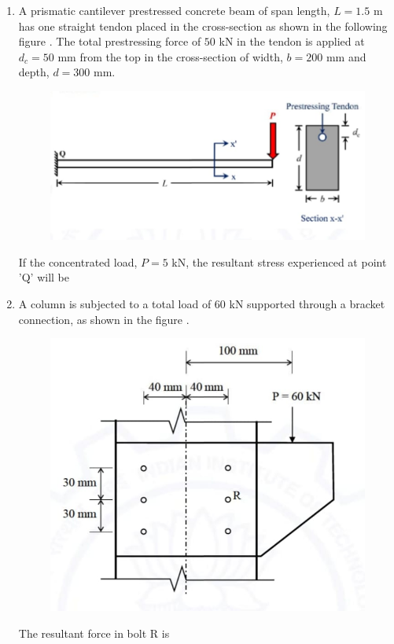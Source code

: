 \documentclass[journal,12pt,onecolumn]{article}
\theoremstyle{remark}
\begin{document}
\begin{enumerate}
\hfill{}

\item A prismatic cantilever prestressed concrete beam of span length, $L=1.5$ m has one straight tendon placed in the cross-section as shown in the following figure  . The total prestressing force of $50$ kN in the tendon is applied at $d_c = 50$ mm from the top in the cross-section of width, $b = 200$ mm and depth, $d = 300$ mm.
\begin{figure}[H]
    \centering
    \includegraphics[width=0.7\columnwidth]{figs/1q39.jpg}
    \caption{}
    \label{fig:q39}
\end{figure}
If the concentrated load, $P = 5$ kN, the resultant stress  experienced at point 'Q' will be \underline{\hspace{2cm}}

\hfill{}

\item A column is subjected to a total load  of $60$ kN supported through a bracket connection, as shown in the figure .
\begin{figure}[H]
    \centering
    \includegraphics[width=0.7\columnwidth]{figs/1q40.jpg}
    \caption{}
    \label{fig:q40}
\end{figure}
The resultant force in bolt R  is \underline{\hspace{2cm}}


\end{enumerate}
\end{document}
